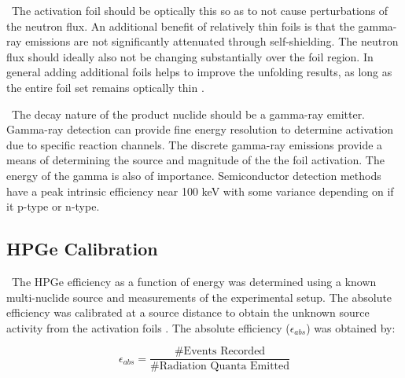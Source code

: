 \documentclass[journal]{IEEEtran}
\begin{document}
	\ The activation foil should be optically this so as to not cause 
	perturbations of the neutron flux. An additional benefit of relatively thin 
	foils is that the gamma-ray emissions are not significantly attenuated 
	through self-shielding. The neutron flux should ideally also not be 
	changing substantially over the foil region. In general adding additional foils helps to improve the unfolding results, as long as the entire foil set remains optically thin  \cite{Vagena2018b}. 
	
	\ The decay nature of the product nuclide should be a gamma-ray 
	emitter. 
	Gamma-ray detection can provide fine energy resolution to 
	determine activation due to specific reaction channels. The discrete gamma-ray emissions provide a means of 
	determining the source and magnitude of the the foil activation. The energy 
	of the gamma is also of importance. Semiconductor detection methods have a 
	peak intrinsic efficiency near 100 keV with some variance depending on if 
	it p-type or n-type. 
	
	\subsection{HPGe Calibration}
	

	\ The HPGe efficiency as a function of energy was determined using a known multi-nuclide source and measurements of the experimental setup. 
The absolute efficiency was calibrated at a source distance to obtain the unknown source activity from the activation foils \cite{Knoll}. 
The absolute efficiency ($\epsilon_{abs}$) was obtained by:
	
	\begin{equation} \label{eq:effa}
	\epsilon_{abs} =\frac{\text{\# Events Recorded}}{\text{\# Radiation Quanta Emitted}}
	\end{equation}
	
\end{document}
